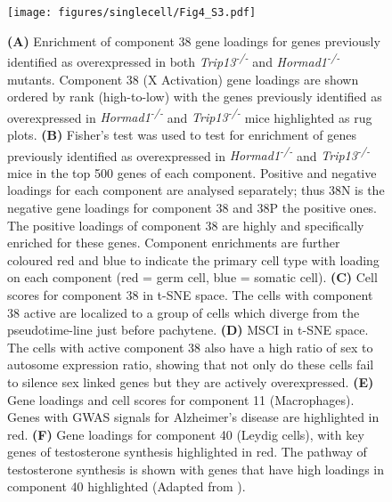 \begin{figure}[H]
	\centering
	\texttt{[image: figures/singlecell/Fig4\_S3.pdf]}
	\caption[Misc. Components]{
		\textbf{(A)} Enrichment of component 38 gene loadings for genes previously identified as overexpressed in both \textit{Trip13\textsuperscript{-/-}} and \textit{Hormad1\textsuperscript{-/-}} mutants. Component 38 (X Activation) gene loadings are shown ordered by rank (high-to-low) with the genes previously identified as overexpressed in \textit{Hormad1\textsuperscript{-/-}} and \textit{Trip13\textsuperscript{-/-}} mice highlighted as rug plots.
		\textbf{(B)} Fisher’s test was used to test for enrichment of genes previously identified as overexpressed in \textit{Hormad1\textsuperscript{-/-}} and \textit{Trip13\textsuperscript{-/-}} mice in the top 500 genes of each component. Positive and negative loadings for each component are analysed separately; thus 38N is the negative gene loadings for component 38 and 38P the positive ones. The positive loadings of component 38 are highly and specifically enriched for these genes. Component enrichments are further coloured red and blue to indicate the primary cell type with loading on each component (red = germ cell, blue = somatic cell). 
		\textbf{(C)} Cell scores for component 38 in t-SNE space. The cells with component 38 active are localized to a group of cells which diverge from the pseudotime-line just before pachytene.
		\textbf{(D)} MSCI in t-SNE space. The cells with active component 38 also have a high ratio of sex to autosome expression ratio, showing that not only do these cells fail to silence sex linked genes but they are actively overexpressed.
		\textbf{(E)} Gene loadings and cell scores for component 11 (Macrophages). Genes with GWAS signals for Alzheimer's disease are highlighted in red. 
		\textbf{(F)} Gene loadings for component 40 (Leydig cells), with key genes of testosterone synthesis highlighted in red. The pathway of testosterone synthesis is shown with genes that have high loadings in component 40 highlighted (Adapted from \cite{Stojkov2013Orally}).
	}
	\label{fig:MiscComponents}
\end{figure}

